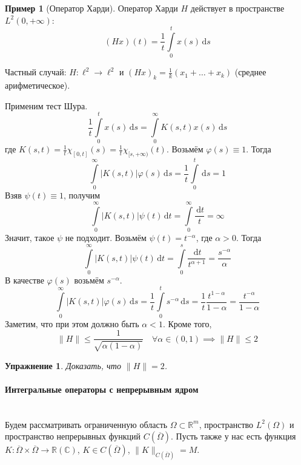 \documentclass[11pt,openany,a4paper]{scrartcl}
\theoremstyle{plain}
\newtheorem{exercise}[theorem]{Упражнение}
\theoremstyle{definition}
\newtheorem{example}[theorem]{Пример}
\newcommand\mb{\mathbb}
\newcommand\real{\mb R}
\newcommand{\complex}{\mb C}
\newcommand\lparagraph[1]{\paragraph{#1}\mbox{}\\}
\newcommand{\dif}{\, \mathrm d}
\begin{document}
\begin{example}[Оператор Харди]
    Оператор Харди $H$ действует в пространстве $L^2(0, +\infty)$:
    $$
    (Hx)(t) = \frac{1}{t}\int\limits_0^t x(s) \dif s
    $$
    
    Частный случай: $H: \ell^2 \to \ell^2$ и
    $(Hx)_k = \frac{1}{k}(x_1 + \ldots + x_k)$ (среднее арифметическое).
    
    Применим тест Шура.
    $$
    \frac{1}{t}\int\limits_0^t x(s) \dif s = \int\limits_0^\infty K(s,t)x(s)\dif s
    $$
    где $K(s,t) = \frac{1}{t}\chi_{[0,t]}(s) = \frac{1}{t}\chi_{[s, +\infty)}(t)$.
    Возьмём $\varphi(s) \equiv 1$. Тогда
    $$
    \int\limits_0^\infty|K(s,t)|\varphi(s) \dif s =
    \frac{1}{t}\int\limits_0^t \dif s = 1
    $$
    Взяв $\psi(t) \equiv 1$, получим
    $$
    \int\limits_0^\infty|K(s,t)|\psi(t) \dif t = \int\limits_0^\infty \frac{\dif t}{t}
    = \infty
    $$
    Значит, такое $\psi$ не подходит. Возьмём $\psi(t) = t^{-\alpha}$, где
    $\alpha > 0$. Тогда
    $$
    \int\limits_0^\infty|K(s,t)|\psi(t) \dif t =
    \int\limits_0^s \frac{\dif t}{t^{\alpha + 1}} =
    \frac{s^{-\alpha}}{\alpha}
    $$
    В качестве $\varphi(s)$ возьмём $s^{-\alpha}$.
    $$
    \int\limits_0^\infty|K(s,t)|\varphi(s) \dif s =
    \frac{1}{t} \int\limits_0^t s^{-\alpha} \dif s =
    \frac{1}{t} \frac{t^{1- \alpha}}{1 - \alpha} =
    \frac{t^{-\alpha}}{1 - \alpha}
    $$
    Заметим, что при этом должно быть $\alpha < 1$. Кроме того,
    $$
    \|H\| \leqslant \frac{1}{\sqrt{\alpha(1 - \alpha)}}\quad
    \forall \alpha \in (0, 1) \implies \|H\| \leqslant 2
    $$
\end{example}
\begin{exercise}
    Доказать, что $\|H\| = 2$.
\end{exercise}

\lparagraph{Интегральные операторы с непрерывным ядром}

Будем рассматривать ограниченную область $\Omega \subset \real^m$, пространство
$L^2(\Omega)$ и пространство непрерывных функций $C(\overline\Omega)$. Пусть также
у нас есть функция
$K: \overline\Omega \times \overline\Omega \to \real(\complex)$,
$K \in C(\overline\Omega)$, $\|K\|_{C(\overline\Omega)} = M$.
\end{document}
